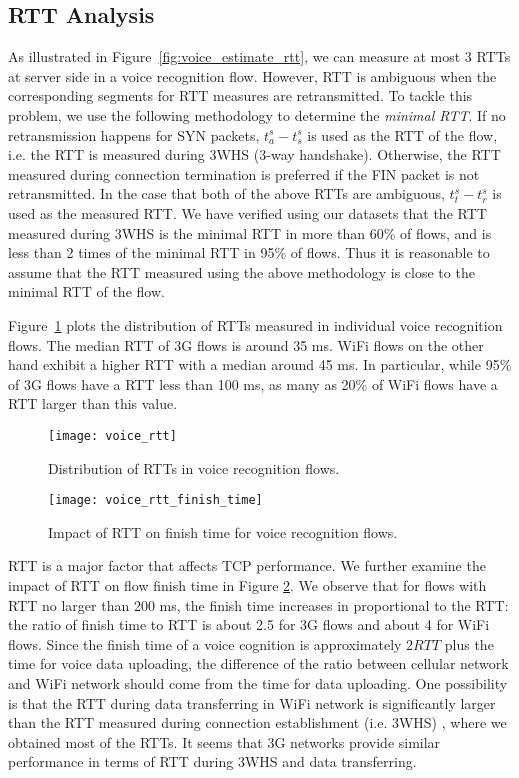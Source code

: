 \subsection{RTT Analysis}

As illustrated in Figure~\ref{fig:voice_estimate_rtt}, we can measure at most 3 RTTs at server side in a voice recognition flow. However, RTT is ambiguous when the corresponding segments for RTT measures are retransmitted. To tackle this problem, we use the following methodology to determine the \emph{minimal RTT}. If no retransmission happens for SYN packets, $t^s_a - t^s_s$ is used as the RTT of the flow, i.e. the RTT is measured during 3WHS (3-way handshake). Otherwise, the RTT measured during connection termination is preferred if the FIN packet is not retransmitted. In the case that both of the above RTTs are ambiguous, $t^s_t - t^s_r$ is used as the measured RTT. We have verified using our datasets that the RTT measured during 3WHS is the minimal RTT in more than 60\% of flows, and is less than 2 times of the minimal RTT in 95\% of flows. Thus it is reasonable to assume that the RTT measured using the above methodology is close to the minimal RTT of the flow.



Figure~\ref{fig:voice_rtt} plots the distribution of RTTs measured in individual voice recognition flows. The median RTT of 3G flows is around 35 ms. WiFi flows on the other hand exhibit a higher RTT with a median around 45 ms. In particular, while 95\% of 3G flows have a RTT less than 100 ms, as many as 20\% of WiFi flows have a RTT larger than this value. 

\begin{figure}[th]
\centering
	\texttt{[image: voice\_rtt]}
\caption{Distribution of RTTs in voice recognition flows.}
\label{fig:voice_rtt}
\end{figure}

\begin{figure}[th]
\centering
	\texttt{[image: voice\_rtt\_finish\_time]}
\caption{Impact of RTT on finish time for voice recognition flows.}
\label{fig:v_rtt_time}
\end{figure}

RTT is a major factor that affects TCP performance. We further examine the impact of RTT on flow finish time in Figure \ref{fig:v_rtt_time}. We observe that for flows with RTT no larger than 200 ms, the finish time increases in proportional to the RTT: the ratio of finish time to RTT is about 2.5 for 3G flows and about 4 for WiFi flows. Since the finish time of a voice cognition is approximately $2RTT$ plus the time for voice data uploading, the difference of the ratio between cellular network and WiFi network should come from the time for data uploading. One possibility is that the RTT during data transferring in WiFi network is significantly larger than the RTT measured during connection establishment (i.e. 3WHS) \cite{UM-CS-2012-022}, where we obtained most of the RTTs. It seems that 3G networks provide similar performance in terms of RTT during 3WHS and data transferring. 

